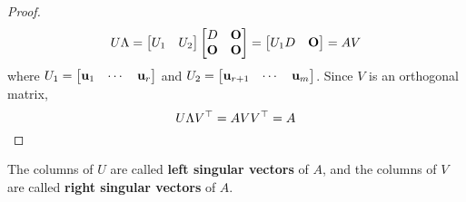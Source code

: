 \begin{Thm}
\begin{proof}
        \begin{equation}
            U\Lambda = \begin{bmatrix}
                U_1 & U_2
            \end{bmatrix} \begin{bmatrix}
                    D & \mathbf{O}\\
                    \mathbf{O} & \mathbf{O}
                \end{bmatrix} = \begin{bmatrix}
                    U_1 D & \mathbf{O}
                \end{bmatrix} = AV
        \end{equation}
        where $U_1 = \begin{bmatrix}
            \mathbf{u}_1 & \cdots & \mathbf{u}_r
        \end{bmatrix}$ and $U_2 = \begin{bmatrix}
            \mathbf{u}_{r+1} & \cdots & \mathbf{u}_{m}
        \end{bmatrix}$. Since $V$ is an orthogonal matrix,
        \begin{equation*}
            U\Lambda V^{\top} = AVV^{\top} = A
        \end{equation*}
    \end{proof}
    \begin{Rem}
            The columns of $U$ are called \textbf{left singular vectors} of $A$, and the columns of $V$ are called \textbf{right singular vectors} of $A$.
    \end{Rem}
\end{Thm}
